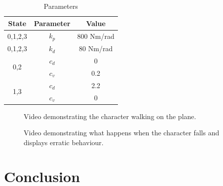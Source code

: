 \documentclass[12pt, a4paper]{article}
\begin{document}
\begin{table}[ht]
\caption{Parameters}
\begin{center}
\begin{tabular}{|c|c|c|}
\hline
State & Parameter & Value \\
\hline
0,1,2,3 & $k_p$ & 800 Nm/rad\\
\hline
0,1,2,3 & $k_d$ & 80 Nm/rad\\
\hline
\multirow{2}{*}{0,2}& $c_d$ & 0\\\cline{2-3}
& $c_v$ & 0.2\\ \cline{2-3}
\hline
\multirow{2}{*}{1,3}& $c_d$ & 2.2\\\cline{2-3}
& $c_v$ & 0\\ \cline{2-3}
\hline
\end{tabular}
\end{center}
\label{tbl:parameters}
\end{table}

\begin{figure}
\begin{center}
\caption{Video demonstrating the character walking on the plane.}\label{vid: character walking}
\end{center}
\end{figure}

\begin{figure}
\begin{center}
\caption{Video demonstrating what happens when the character falls and displays erratic behaviour.}\label{vid: character falling}
\end{center}
\end{figure}

\section{Conclusion}
\end{document}
